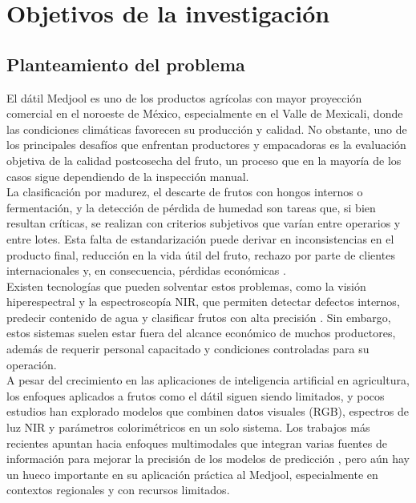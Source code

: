 
\chapter{Objetivos de la investigación}

\label{Chapter2}


\section{Planteamiento del problema}

El dátil Medjool es uno de los productos agrícolas con mayor proyección comercial en el noroeste de México, especialmente en el Valle de Mexicali, donde las condiciones climáticas favorecen su producción y calidad. No obstante, uno de los principales desafíos que enfrentan productores y empacadoras es la evaluación objetiva de la calidad postcosecha del fruto, un proceso que en la mayoría de los casos sigue dependiendo de la inspección manual.\\

La clasificación por madurez, el descarte de frutos con hongos internos o fermentación, y la detección de pérdida de humedad son tareas que, si bien resultan críticas, se realizan con criterios subjetivos que varían entre operarios y entre lotes. Esta falta de estandarización puede derivar en inconsistencias en el producto final, reducción en la vida útil del fruto, rechazo por parte de clientes internacionales y, en consecuencia, pérdidas económicas \parencite{perez-perez_evaluation_2021}.\\

Existen tecnologías que pueden solventar estos problemas, como la visión hiperespectral y la espectroscopía NIR, que permiten detectar defectos internos, predecir contenido de agua y clasificar frutos con alta precisión \parencite{ulu_comparison_2025, yuan_determination_2025}. Sin embargo, estos sistemas suelen estar fuera del alcance económico de muchos productores, además de requerir personal capacitado y condiciones controladas para su operación.\\

A pesar del crecimiento en las aplicaciones de inteligencia artificial en agricultura, los enfoques aplicados a frutos como el dátil siguen siendo limitados, y pocos estudios han explorado modelos que combinen datos visuales (RGB), espectros de luz NIR y parámetros colorimétricos en un solo sistema. Los trabajos más recientes apuntan hacia enfoques multimodales que integran varias fuentes de información para mejorar la precisión de los modelos de predicción \parencite{gupta_fruveg-net_2024, apostolopoulos_general_2023}, pero aún hay un hueco importante en su aplicación práctica al Medjool, especialmente en contextos regionales y con recursos limitados.\\


